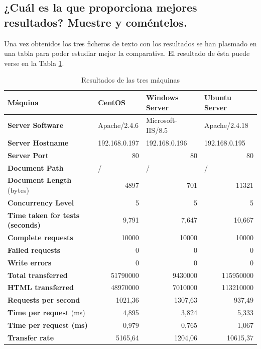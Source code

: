 \newpage

\subsection{¿Cuál es la que proporciona mejores resultados? Muestre y
	coméntelos.}

Una vez obtenidos los tres ficheros de texto con los resultados se han plasmado en una tabla para poder estudiar mejor la comparativa. El resultado de ésta puede verse en la Tabla \ref{tab:addlabel}.

\begin{table}[H]
	\centering
	\begin{tabular}{lrrr}
		\textbf{Máquina} & \multicolumn{1}{l}{\textbf{CentOS}} & \multicolumn{1}{l}{\textbf{Windows Server}} & \multicolumn{1}{l}{\textbf{Ubuntu Server}} \\
		\hline
		\textbf{Server Software} & \multicolumn{1}{l}{Apache/2.4.6} & \multicolumn{1}{l}{Microsoft-IIS/8.5} & \multicolumn{1}{l}{Apache/2.4.18} \\
		\textbf{Server Hostname} & \multicolumn{1}{l}{192.168.0.197} & \multicolumn{1}{l}{192.168.0.196} & \multicolumn{1}{l}{192.168.0.195} \\
		\textbf{Server Port} & 80    & 80    & 80 \\
		\textbf{Document Path} & \multicolumn{1}{l}{/} & \multicolumn{1}{l}{/} & \multicolumn{1}{l}{/} \\
		\textbf{Document Length} (bytes) & 4897  & 701   & 11321 \\
		\textbf{Concurrency Level} & 5     & 5     & 5 \\
		\textbf{Time taken for tests (seconds)} & 9,791 & 7,647 & 10,667 \\
		\textbf{Complete requests} & 10000 & 10000 & 10000 \\
		\textbf{Failed requests} & 0     & 0     & 0 \\
		\textbf{Write errors} & 0     & 0     & 0 \\
		\textbf{Total transferred} & 51790000 & 9430000 & 115950000 \\
		\textbf{HTML transferred} & 48970000 & 7010000 & 113210000 \\
		\textbf{Requests per second} & 1021,36 & 1307,63 & 937,49 \\
		\textbf{Time per request} (ms) & 4,895 & 3,824 & 5,333 \\
		\textbf{Time per request (ms)} & 0,979 & 0,765 & 1,067 \\
		\textbf{Transfer rate} & 5165,64 & 1204,06 & 10615,37 \\
	\end{tabular}%
	\caption{Resultados de las tres máquinas}
	\label{tab:addlabel}%
\end{table}%

